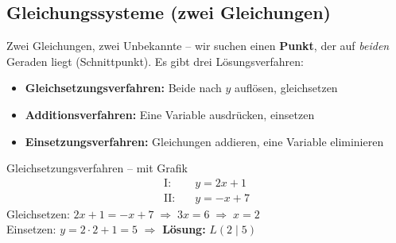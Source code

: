 \documentclass[12pt, a4paper]{article}
\begin{document}
\subsection{Gleichungssysteme (zwei Gleichungen)}

\begin{merkbox}
Zwei Gleichungen, zwei Unbekannte -- wir suchen einen \textbf{Punkt}, der auf
\textit{beiden} Geraden liegt (Schnittpunkt). Es gibt drei L\"osungsverfahren:
\begin{itemize}
  \item \textbf{Gleichsetzungsverfahren:} Beide nach $y$ aufl\"osen, gleichsetzen
  \item \textbf{Additionsverfahren:} Eine Variable ausdr\"ucken, einsetzen
  \item \textbf{Einsetzungsverfahren:} Gleichungen addieren, eine Variable eliminieren
\end{itemize}
\end{merkbox}

\begin{examplebox}{Gleichsetzungsverfahren -- mit Grafik}
\begin{align*}
  \text{I:}  &\quad y = 2x + 1 \\
  \text{II:} &\quad y = -x + 7
\end{align*}
Gleichsetzen: $2x+1 = -x+7 \;\Rightarrow\; 3x=6 \;\Rightarrow\; x=2$\\
Einsetzen: $y = 2\cdot2+1 = 5$ \quad $\Rightarrow$ \textbf{L\"osung: } $L(2\mid 5)$

\vspace{0.4cm}
\begin{center}
\end{center}
\end{examplebox}
\end{document}
